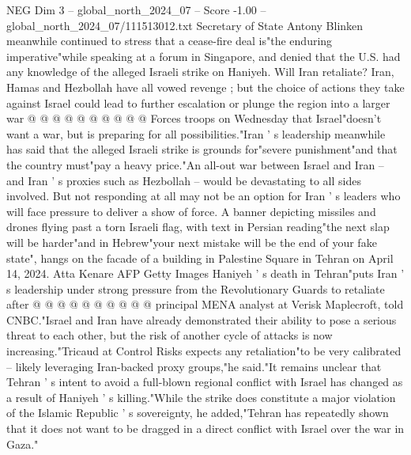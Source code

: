 \begin{textsample}{NEG Dim 3 – global\_north\_2024\_07 – Score -1.00 – global\_north\_2024\_07/111513012.txt}
Secretary of State Antony Blinken meanwhile continued to stress that a cease-fire deal is"the enduring imperative"while speaking at a forum in Singapore, and denied that the U.S. had any knowledge of the alleged Israeli strike on Haniyeh.
Will Iran retaliate?
Iran, Hamas and Hezbollah have all vowed revenge ; but the choice of actions they take against Israel could lead to further escalation or plunge the region into a larger war @ @ @ @ @ @ @ @ @ @ Forces troops on Wednesday that Israel"doesn't want a war, but is preparing for all possibilities."Iran ' s leadership meanwhile has said that the alleged Israeli strike is grounds for"severe punishment"and that the country must"pay a heavy price."An all-out war between Israel and Iran -- and Iran ' s proxies such as Hezbollah -- would be devastating to all sides involved.
But not responding at all may not be an option for Iran ' s leaders who will face pressure to deliver a show of force.
A banner depicting missiles and drones flying past a torn Israeli flag, with text in Persian reading"the next slap will be harder"and in Hebrew"your next mistake will be the end of your fake state", hangs on the facade of a building in Palestine Square in Tehran on April 14, 2024.
Atta Kenare AFP Getty Images Haniyeh ' s death in Tehran"puts Iran ' s leadership under strong pressure from the Revolutionary Guards to retaliate after @ @ @ @ @ @ @ @ @ @ principal MENA analyst at Verisk Maplecroft, told CNBC."Israel and Iran have already demonstrated their ability to pose a serious threat to each other, but the risk of another cycle of attacks is now increasing."Tricaud at Control Risks expects any retaliation"to be very calibrated -- likely leveraging Iran-backed proxy groups,"he said."It remains unclear that Tehran ' s intent to avoid a full-blown regional conflict with Israel has changed as a result of Haniyeh ' s killing."While the strike does constitute a major violation of the Islamic Republic ' s sovereignty, he added,"Tehran has repeatedly shown that it does not want to be dragged in a direct conflict with Israel over the war in Gaza."

\end{textsample}
